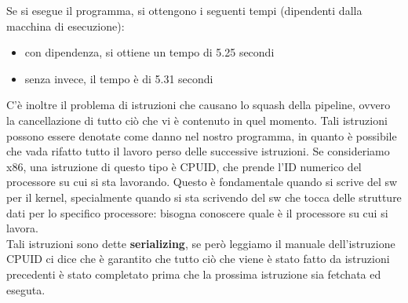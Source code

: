 \documentclass[12pt, oneside]{extbook}
\begin{document}
Se si esegue il programma, si ottengono i seguenti tempi (dipendenti dalla macchina di esecuzione):
\begin{itemize}
\item con dipendenza, si ottiene un tempo di 5.25 secondi
\item senza invece, il tempo è di 5.31 secondi
\end{itemize}
C'è inoltre il problema di istruzioni che causano lo squash della pipeline, ovvero la cancellazione di tutto ciò che vi è contenuto in quel momento. Tali istruzioni possono essere denotate come danno nel nostro programma, in quanto è possibile che vada rifatto tutto il lavoro perso delle successive istruzioni. Se consideriamo x86, una istruzione di questo tipo è \textsf{CPUID}, che prende l'ID numerico del processore su cui si sta lavorando. Questo è fondamentale quando si scrive del sw per il kernel, specialmente quando si sta scrivendo del sw che tocca delle strutture dati per lo specifico processore: bisogna conoscere quale è il processore su cui si lavora.\\ Tali istruzioni sono dette \textbf{serializing}, se però leggiamo il manuale dell'istruzione CPUID ci dice che è garantito che tutto ciò che viene è stato fatto da istruzioni precedenti è stato completato prima che la prossima istruzione sia fetchata ed eseguta.
\end{document}
